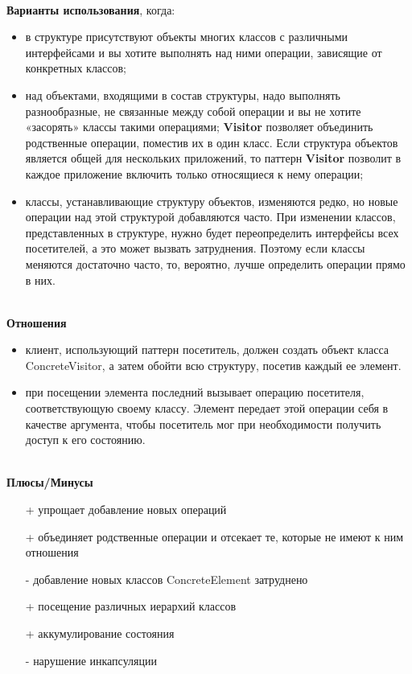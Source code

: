 \documentclass[a3paper,11pt]{report}
\begin{document}
\large\textbf{\\Варианты использования}, когда:
\begin{itemize}
\item в структуре присутствуют объекты многих классов с различными интерфейсами и вы хотите выполнять над ними операции, зависящие от конкретных классов;
\item над объектами, входящими в состав структуры, надо выполнять разнообразные, не связанные между собой операции и вы не хотите «засорять» классы такими операциями; \textbf{Visitor} позволяет объединить родственные операции, поместив их в один класс. Если структура объектов является общей для нескольких приложений, то паттерн \textbf{Visitor} позволит в каждое приложение включить только относящиеся к нему операции;
\item классы, устанавливающие структуру объектов, изменяются редко, но новые операции над этой структурой добавляются часто. При изменении классов, представленных в структуре, нужно будет переопределить интерфейсы всех посетителей, а это может вызвать затруднения. Поэтому если классы меняются достаточно часто, то, вероятно, лучше определить операции прямо в них.
\end{itemize}

\textbf{\\Отношения}
\begin{itemize}
\item клиент, использующий паттерн посетитель, должен создать объект класса ConcreteVisitor, а затем обойти всю структуру, посетив каждый ее элемент.
\item при посещении элемента последний вызывает операцию посетителя, соответствующую своему классу. Элемент передает этой операции себя в качестве аргумента, чтобы посетитель мог при необходимости получить доступ к его состоянию.
\end{itemize}

\textbf{\\Плюсы/Минусы}
\begin{itemize}
\item [+] упрощает добавление новых операций
\item [+] объединяет родственные операции и отсекает те, которые не имеют к ним отношения
\item [-] добавление новых классов ConcreteElement затруднено
\item [+] посещение различных иерархий классов
\item [+] аккумулирование состояния
\item [-] нарушение инкапсуляции
\end{itemize}
\end{document}
